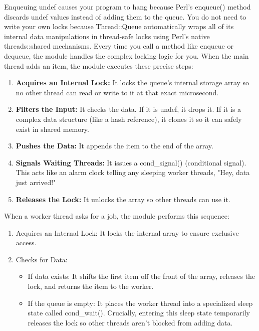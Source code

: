 \documentclass{report}
\begin{document}
\begin{itemize}
            \bigbreak \noindent 
            Enqueuing undef causes your program to hang because Perl's enqueue() method discards undef values instead of adding them to the queue.
            \bigbreak \noindent 
            You do not need to write your own locks because Thread::Queue automatically wraps all of its internal data manipulations in thread-safe locks using Perl’s native threads::shared mechanisms. Every time you call a method like enqueue or dequeue, the module handles the complex locking logic for you.
            \bigbreak \noindent 
            When the main thread adds an item, the module executes these precise steps:
            \begin{enumerate}
                \item \textbf{Acquires an Internal Lock:} It locks the queue's internal storage array so no other thread can read or write to it at that exact microsecond.
                \item \textbf{Filters the Input:} It checks the data. If it is undef, it drops it. If it is a complex data structure (like a hash reference), it clones it so it can safely exist in shared memory.
                \item \textbf{Pushes the Data:} It appends the item to the end of the array.
                \item \textbf{Signals Waiting Threads:} It issues a cond\_signal() (conditional signal). This acts like an alarm clock telling any sleeping worker threads, "Hey, data just arrived!"
                \item \textbf{Releases the Lock:} It unlocks the array so other threads can use it.
            \end{enumerate}
            When a worker thread asks for a job, the module performs this sequence:
            \begin{enumerate}
                \item Acquires an Internal Lock: It locks the internal array to ensure exclusive access.
                \item Checks for Data:
                \begin{itemize}
                    \item If data exists: It shifts the first item off the front of the array, releases the lock, and returns the item to the worker.
                    \item If the queue is empty: It places the worker thread into a specialized sleep state called cond\_wait(). Crucially, entering this sleep state temporarily releases the lock so other threads aren't blocked from adding data.

\end{itemize}
\end{enumerate}
\end{itemize}
\end{document}

